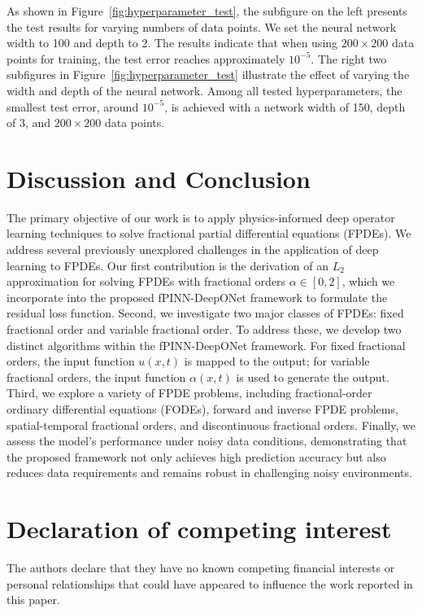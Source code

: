 \documentclass[11pt]{article}
\begin{document}
As shown in Figure~\ref{fig:hyperparameter_test}, the subfigure on the left presents the test results for varying numbers of data points. We set the neural network width to 100 and depth to 2. The results indicate that when using $200 \times 200$ data points for training, the test error reaches approximately $10^{-5}$. The right two subfigures in Figure~\ref{fig:hyperparameter_test} illustrate the effect of varying the width and depth of the neural network. Among all tested hyperparameters, the smallest test error, around $10^{-5}$, is achieved with a network width of 150, depth of 3, and $200 \times 200$ data points.




\section{Discussion and Conclusion}
The primary objective of our work is to apply physics-informed deep operator learning techniques to solve fractional partial differential equations (FPDEs). We address several previously unexplored challenges in the application of deep learning to FPDEs. Our first contribution is the derivation of an $L_2$ approximation for solving FPDEs with fractional orders $\alpha \in [0, 2]$, which we incorporate into the proposed fPINN-DeepONet framework to formulate the residual loss function. Second, we investigate two major classes of FPDEs: fixed fractional order and variable fractional order. To address these, we develop two distinct algorithms within the fPINN-DeepONet framework. For fixed fractional orders, the input function $u(x,t)$ is mapped to the output; for variable fractional orders, the input function $\alpha(x,t)$ is used to generate the output. Third, we explore a variety of FPDE problems, including fractional-order ordinary differential equations (FODEs), forward and inverse FPDE problems, spatial-temporal fractional orders, and discontinuous fractional orders. Finally, we assess the model’s performance under noisy data conditions, demonstrating that the proposed framework not only achieves high prediction accuracy but also reduces data requirements and remains robust in challenging noisy environments.


\section*{Declaration of competing interest}
The authors declare that they have no known competing financial interests or personal relationships that could have appeared to
influence the work reported in this paper.
\end{document}
